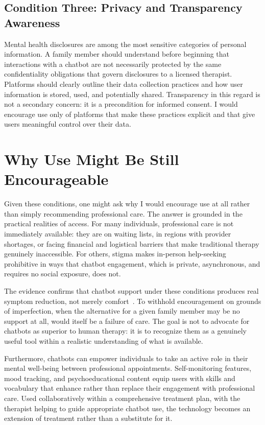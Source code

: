 \documentclass[11pt,showkeys]{essay}
\begin{document}
\subsection{Condition Three: Privacy and Transparency Awareness}

Mental health disclosures are among the most sensitive categories of personal information. A family member should understand before beginning that interactions with a chatbot are not necessarily protected by the same confidentiality obligations that govern disclosures to a licensed therapist. Platforms should clearly outline their data collection practices and how user information is stored, used, and potentially shared. Transparency in this regard is not a secondary concern: it is a precondition for informed consent. I would encourage use only of platforms that make these practices explicit and that give users meaningful control over their data.

\section{Why Use Might Be Still Encourageable}

Given these conditions, one might ask why I would encourage use at all rather than simply recommending professional care. The answer is grounded in the practical realities of access. For many individuals, professional care is not immediately available: they are on waiting lists, in regions with provider shortages, or facing financial and logistical barriers that make traditional therapy genuinely inaccessible. For others, stigma makes in-person help-seeking prohibitive in ways that chatbot engagement, which is private, asynchronous, and requires no social exposure, does not.

The evidence confirms that chatbot support under these conditions produces real symptom reduction, not merely comfort~\cite{fitzpatrick_woebot_2017,jabir_evaluating_2022}. To withhold encouragement on grounds of imperfection, when the alternative for a given family member may be no support at all, would itself be a failure of care. The goal is not to advocate for chatbots as superior to human therapy: it is to recognize them as a genuinely useful tool within a realistic understanding of what is available.

Furthermore, chatbots can empower individuals to take an active role in their mental well-being between professional appointments. Self-monitoring features, mood tracking, and psychoeducational content equip users with skills and vocabulary that enhance rather than replace their engagement with professional care. Used collaboratively within a comprehensive treatment plan, with the therapist helping to guide appropriate chatbot use, the technology becomes an extension of treatment rather than a substitute for it.
\end{document}
